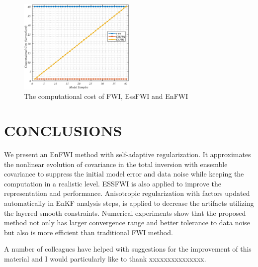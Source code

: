 \documentclass[mreferee]{gji}
\begin{document}
\begin{figure}
\center
\includegraphics[width=0.5\textwidth]{fig/performance.eps}
\caption{The computational cost of FWI, EssFWI and EnFWI}
\label{fig:performance}
\end{figure}

\section{CONCLUSIONS}

We present an EnFWI method with self-adaptive regularization. It approximates the nonlinear evolution of covariance in the total inversion with ensemble covariance to suppress the initial model error and data noise while keeping the computation in a realistic level. ESSFWI is also applied to improve the representation and performance. Anisotropic regularization with factors updated automatically in EnKF analysis steps, is applied to decrease the artifacts utilizing the layered smooth constraints. Numerical experiments show that the proposed method not only has larger convergence range and better tolerance to data noise but also is  more efficient than traditional FWI method.


\begin{acknowledgments}
A number of colleagues have helped with suggestions for the improvement of this material and I would particularly like to thank xxxxxxxxxxxxxxx.
\end{acknowledgments}
\end{document}
